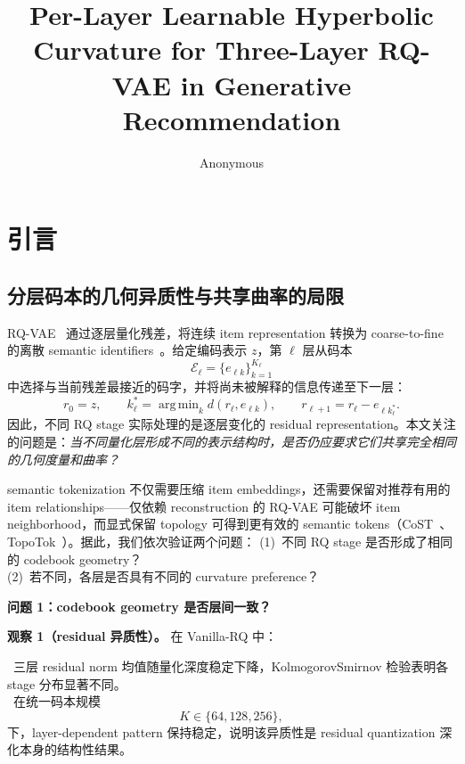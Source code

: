 \documentclass[sigconf, nonacm, anonymize, 9pt]{acmart}
\title{Per-Layer Learnable Hyperbolic Curvature for Three-Layer RQ-VAE in Generative Recommendation}
\author{Anonymous}
\DeclareMathOperator{\argmin}{arg\,min}
\begin{document}
\maketitle

\section{引言}

\subsection{分层码本的几何异质性与共享曲率的局限}

RQ-VAE~\cite{lee2022rqvae} 通过逐层量化残差，将连续 item representation 转换为 coarse-to-fine 的离散 semantic identifiers~\cite{rajput2023tiger,singh2024rqvae}。给定编码表示 $z$，第 $\ell$ 层从码本
\begin{equation}
\mathcal{E}_{\ell}=\{e_{\ell k}\}_{k=1}^{K_{\ell}}
\end{equation}
中选择与当前残差最接近的码字，并将尚未被解释的信息传递至下一层：
\begin{equation}
r_0=z,\qquad
k_\ell^{*}=\argmin_k d(r_\ell,e_{\ell k}),\qquad
r_{\ell+1}=r_\ell-e_{\ell k_\ell^{*}}.
\end{equation}
因此，不同 RQ stage 实际处理的是逐层变化的 residual representation。本文关注的问题是：\emph{当不同量化层形成不同的表示结构时，是否仍应要求它们共享完全相同的几何度量和曲率？}

semantic tokenization 不仅需要压缩 item embeddings，还需要保留对推荐有用的 item relationships——仅依赖 reconstruction 的 RQ-VAE 可能破坏 item neighborhood，而显式保留 topology 可得到更有效的 semantic tokens（CoST~\cite{jin2024cost}、TopoTok~\cite{topotok2026}）。据此，我们依次验证两个问题：
\noindent(1)\ 不同 RQ stage 是否形成了相同的 codebook geometry？\\[2pt]
\noindent(2)\ 若不同，各层是否具有不同的 curvature preference？

\noindent\textbf{问题 1：codebook geometry 是否层间一致？}

\noindent\textbf{观察 1（residual 异质性）。} 在 Vanilla-RQ 中：

\noindent\textbullet\ 三层 residual norm 均值随量化深度稳定下降，Kolmogorov\-Smirnov 检验表明各 stage 分布显著不同。\\[2pt]
\noindent\textbullet\ 在统一码本规模
\begin{equation}
K\in\{64,128,256\},
\end{equation}
下，layer-dependent pattern 保持稳定，说明该异质性是 residual quantization 深化本身的结构性结果。
\end{document}
